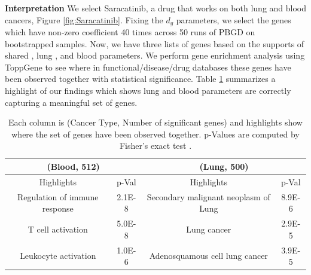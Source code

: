 {\bf Interpretation}
We select Saracatinib, a drug that works on both lung and blood cancers, Figure \ref{fig:Saracatinib}. 
Fixing the $d_g$ parameters, we select the genes which have non-zero coefficient 40 times across 50 runs of PBGD on bootstrapped samples.
Now, we have three lists of genes based on the supports of shared , lung , and blood parameters. 
We perform gene enrichment analysis using ToppGene \cite{chen09toppgene} to see where in functional/disease/drug databases these genes have been observed together with statistical significance. 
Table \ref{table:1} summarizes a highlight of our findings which shows lung and blood parameters are correctly capturing a meaningful set of genes.%
\begin{table}
	\centering
	\begin{tabular}{ |c|c|c|c|  }
		\hline 	
		\multicolumn{2}{|c|}{(Blood, 512)} & \multicolumn{2}{c|}{(Lung, 500)}\\
		\hline
		Highlights &    p-Val  & Highlights &    p-Val   \\
		\hline
		Regulation of immune response	 & 2.1E-8  & Secondary malignant neoplasm of Lung & 8.9E-6  \\
		T cell activation	 & 5.0E-8   & Lung cancer  & 2.9E-5   \\
		Leukocyte activation & 1.0E-6  & Adenosquamous cell lung cancer	 & 3.9E-5 \\
		\hline
	\end{tabular}
\caption{Each column is (Cancer Type, Number of significant genes) and highlights show where the set of genes have been observed together. p-Values are computed by  Fisher's exact test \cite{chen09toppgene}.}
\label{table:1}
\end{table}

